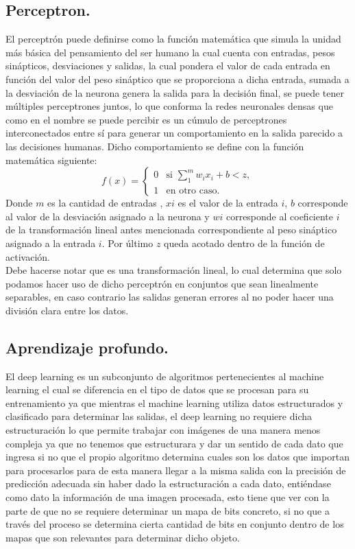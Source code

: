 \documentclass[a4paper, 12pt]{article}
\begin{document}
    \subsection{Perceptron.}
    El perceptrón puede definirse como la función matemática que simula la unidad más básica del pensamiento del ser humano la cual cuenta con entradas, pesos sinápticos, desviaciones y salidas, la cual pondera el valor de cada entrada en función del valor del peso sináptico que se proporciona a dicha entrada, sumada a la desviación de la neurona genera la salida para la decisión final, se puede tener múltiples perceptrones juntos, lo que conforma la redes neuronales densas que como en el nombre se puede percibir es un cúmulo de perceptrones interconectados entre sí para generar un comportamiento en la salida parecido a las decisiones humanas. Dicho comportamiento se define con la función matemática siguiente:
    \[
    f(x) =
    \begin{cases}
        0 & \text{si } \sum\limits_{1}^{m} w_i x_i + b < z, \\
        1 & \text{en otro caso}.
    \end{cases}
    \]
    Donde $m$ es la cantidad de entradas , $xi$ es el valor de la entrada $i$, $b$ corresponde al valor de la desviación asignado a la neurona y $wi$ corresponde al coeficiente $i$ de la transformación lineal antes mencionada correspondiente al peso sináptico asignado a la entrada $i$. Por último $z$ queda acotado dentro de la función de activación.\\
    Debe hacerse notar que es una transformación lineal, lo cual determina que solo podamos hacer uso de dicho perceptrón en conjuntos que sean linealmente separables, en caso contrario las salidas generan errores al no poder hacer una división clara entre los datos.

    \subsection{Aprendizaje profundo.}
    El deep learning es un subconjunto de algoritmos pertenecientes al machine learning el cual se diferencia en el tipo de datos que se procesan para su entrenamiento ya que mientras el machine learning utiliza datos estructurados y clasificado para determinar las salidas, el deep learning no requiere dicha estructuración lo que permite trabajar con imágenes de una manera menos compleja ya que no tenemos que estructurara y dar un sentido de cada dato que ingresa si no que el propio algoritmo determina cuales son los datos que importan para procesarlos para de esta manera llegar a la misma salida con la precisión de predicción adecuada sin haber dado la estructuración a cada dato, entiéndase como dato la información de una imagen procesada, esto tiene que ver con la parte de que no se requiere determinar un mapa de bits concreto, si no que a través del proceso se determina cierta cantidad de bits en conjunto dentro de los mapas que son relevantes para determinar dicho objeto. 
\end{document}

